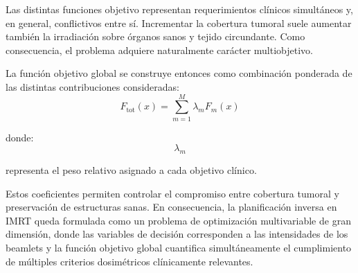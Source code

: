 Las distintas funciones objetivo representan requerimientos clínicos simultáneos y, en general, conflictivos entre sí. Incrementar la cobertura tumoral suele aumentar también la irradiación sobre órganos sanos y tejido circundante. Como consecuencia, el problema adquiere naturalmente carácter multiobjetivo.

La función objetivo global se construye entonces como combinación ponderada de las distintas contribuciones consideradas:
\[
F_{\text{tot}}(x)
=
\sum_{m=1}^{M}
\lambda_m F_m(x)
\]

donde:
\[
\lambda_m
\]

representa el peso relativo asignado a cada objetivo clínico.

Estos coeficientes permiten controlar el compromiso entre cobertura tumoral y preservación de estructuras sanas. En consecuencia, la planificación inversa en IMRT queda formulada como un problema de optimización multivariable de gran dimensión, donde las variables de decisión corresponden a las intensidades de los beamlets y la función objetivo global cuantifica simultáneamente el cumplimiento de múltiples criterios dosimétricos clínicamente relevantes.